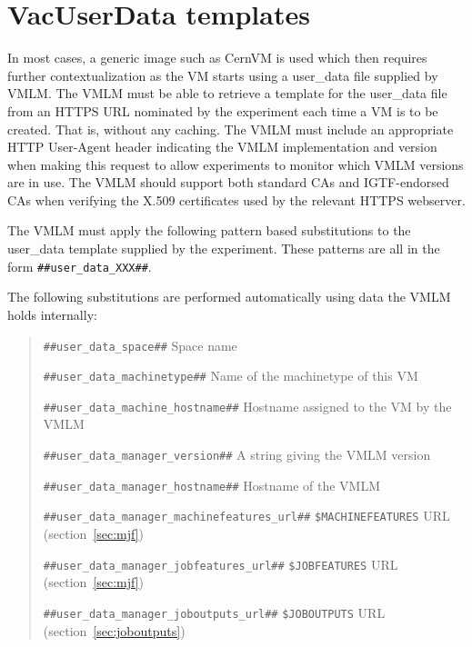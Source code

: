 \documentclass[12pt,a4paper]{article}
\begin{document}
\section{VacUserData templates}
\label{sec:vacuserdata}

In most cases, a generic image such as CernVM is used which then
requires further contextualization as the VM starts using a user\_data
file supplied by VMLM. The VMLM must be able to retrieve a template for
the user\_data file
from an HTTPS URL nominated by the experiment each time a VM is to 
be created. That is, without any caching. The VMLM must include an
appropriate HTTP User-Agent header indicating the VMLM implementation
and version when making this request to allow experiments to monitor
which VMLM versions are in use. The VMLM should support both standard CAs
and IGTF-endorsed CAs when verifying the X.509 certificates used by the
relevant HTTPS webserver.

The VMLM must apply the following pattern
based substitutions to the user\_data template supplied by the experiment.
These patterns are all in the form \texttt{\#\#user\_data\_XXX\#\#}.

The following substitutions are performed automatically
using data the VMLM holds internally:

\begin{quote}
\begin{description}
\setlength{\parskip}{0pt}
\item{\texttt{\#\#user\_data\_space\#\#}} Space name
\item{\texttt{\#\#user\_data\_machinetype\#\#}} Name of the machinetype of this VM
\item{\texttt{\#\#user\_data\_machine\_hostname\#\#}} Hostname assigned to the VM by the VMLM
\item{\texttt{\#\#user\_data\_manager\_version\#\#}} A string giving the VMLM version
\item{\texttt{\#\#user\_data\_manager\_hostname\#\#}} Hostname of the VMLM
\item{\texttt{\#\#user\_data\_manager\_machinefeatures\_url\#\#}} \texttt{\$MACHINEFEATURES} URL (section~\ref{sec:mjf})
\item{\texttt{\#\#user\_data\_manager\_jobfeatures\_url\#\#}} \texttt{\$JOBFEATURES} URL (section~\ref{sec:mjf})
\item{\texttt{\#\#user\_data\_manager\_joboutputs\_url\#\#}} \texttt{\$JOBOUTPUTS} URL (section~\ref{sec:joboutputs})
\end{description}
\end{quote}
\end{document}
